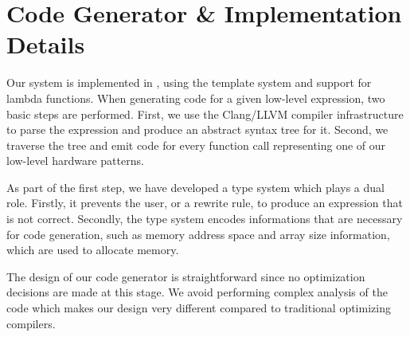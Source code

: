 



\section{Code Generator \& Implementation Details}

Our system is implemented in \Cpp, using the template system and support for lambda functions. 
When generating code for a given low-level expression, two basic steps are performed.
First, we use the Clang/LLVM compiler infrastructure to parse the expression and produce an abstract syntax tree for it.
Second, we traverse the tree and emit code for every function call representing one of our low-level hardware patterns.

As part of the first step, we have developed a type system which plays a dual role.
Firstly, it prevents the user, or a rewrite rule, to produce an expression that is not correct.
Secondly, the type system encodes informations that are necessary for code generation, such as memory address space and array size information, which are used to allocate memory.

The design of our code generator is straightforward since no optimization decisions are made at this stage.
We avoid performing complex analysis of the code which makes our design very different compared to traditional optimizing compilers.

